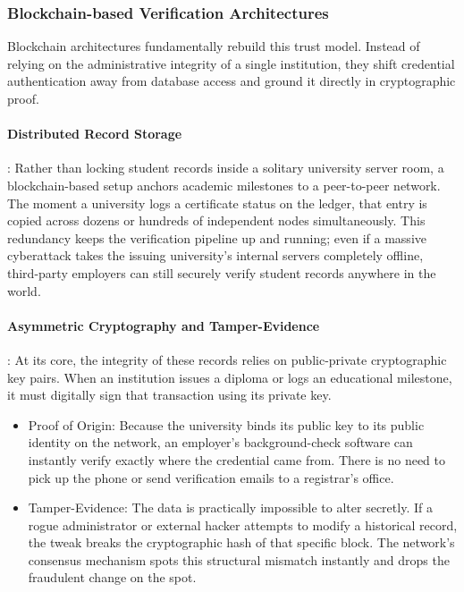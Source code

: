 \subsubsection{Blockchain-based Verification Architectures}

Blockchain architectures fundamentally rebuild this trust model. Instead of relying on the administrative integrity of a single institution, they shift credential authentication away from database access and ground it directly in cryptographic proof\cite{blockchainineducation}.

\paragraph{Distributed Record Storage}: Rather than locking student records inside a solitary university server room, a blockchain-based setup anchors academic milestones to a peer-to-peer network\cite{blockchainineducationv2}. The moment a university logs a certificate status on the ledger, that entry is copied across dozens or hundreds of independent nodes simultaneously. This redundancy keeps the verification pipeline up and running; even if a massive cyberattack takes the issuing university's internal servers completely offline, third-party employers can still securely verify student records anywhere in the world\cite{blockchainineducation}.

\paragraph{Asymmetric Cryptography and Tamper-Evidence}: At its core, the integrity of these records relies on public-private cryptographic key pairs. When an institution issues a diploma or logs an educational milestone, it must digitally sign that transaction using its private key\cite{blockchainineducationv2}.

\begin{itemize}
    \item Proof of Origin: Because the university binds its public key to its public identity on the network, an employer's background-check software can instantly verify exactly where the credential came from. There is no need to pick up the phone or send verification emails to a registrar's office\cite{blockchainineducation}.

    \item Tamper-Evidence: The data is practically impossible to alter secretly. If a rogue administrator or external hacker attempts to modify a historical record, the tweak breaks the cryptographic hash of that specific block. The network's consensus mechanism spots this structural mismatch instantly and drops the fraudulent change on the spot\cite{blockchainineducationv2}.
\end{itemize}

